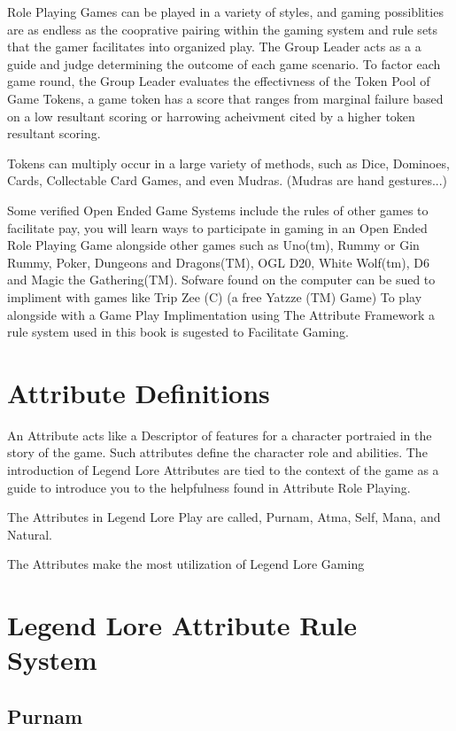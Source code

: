 \documentclass{article}
\begin{document}
Role Playing Games can be played in a variety of styles, and gaming possiblities are as endless as the cooprative pairing within the gaming system and rule sets that the gamer facilitates into organized play. The Group Leader acts as a a guide and judge determining the outcome of each game scenario. To factor each game round, the Group Leader evaluates the effectivness of the Token Pool of Game Tokens, a game token has a score that ranges from marginal failure based on a low resultant scoring or harrowing acheivment cited by a higher token resultant scoring.

Tokens can multiply occur in a large variety of methods, such as Dice, Dominoes, Cards, Collectable Card Games, and even Mudras. (Mudras are hand gestures...)

Some verified Open Ended Game Systems include the rules of other games to facilitate pay, you will learn ways to participate in gaming in an Open Ended Role Playing Game alongside other games such as Uno(tm), Rummy or Gin Rummy, Poker, Dungeons and Dragons(TM), OGL D20, White Wolf(tm), D6 and Magic the Gathering(TM). Sofware found on the computer can be sued to impliment with games like Trip Zee (C) (a free Yatzze (TM) Game) To play alongside with a Game Play Implimentation using The Attribute Framework a rule system used in this book is sugested to Facilitate Gaming.

\section{Attribute Definitions}
An Attribute acts like a Descriptor of features for a character portraied in the story of the game. Such attributes define the character role and abilities. The introduction of Legend Lore Attributes are tied to the context of the game as a guide to introduce you to the helpfulness found in Attribute Role Playing.

The Attributes in Legend Lore Play are called, Purnam, Atma, Self, Mana, and Natural.

The Attributes make the most utilization of Legend Lore Gaming

\section{Legend Lore Attribute Rule System}

\subsection{Purnam}
\end{document}

